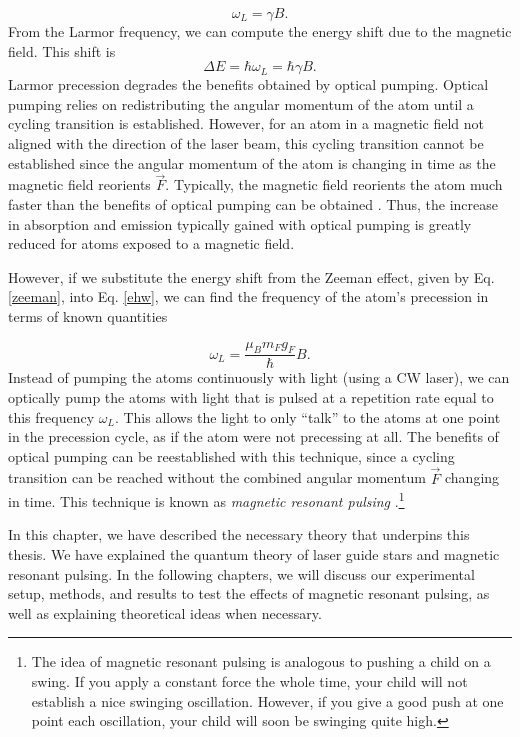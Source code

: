 \begin{equation}
  \omega_L = \gamma B.
  \label{larmorfrequency}
\end{equation}
%
From the Larmor frequency, we can compute the energy shift due to the magnetic field. This shift is
\begin{equation}
		\Delta E = \hbar \omega_L = \hbar \gamma B.
		\label{ehw}
\end{equation}
%
Larmor precession degrades the benefits obtained by optical pumping. Optical pumping relies on redistributing the angular momentum of the atom until a cycling transition is established. However, for an atom in a magnetic field not aligned with the direction of the laser beam, this cycling transition cannot be established since the angular momentum of the atom is changing in time as the magnetic field reorients $\vec F$. Typically, the magnetic field reorients the atom much faster than the benefits of optical pumping can be obtained \cite{Kane2014}. Thus, the increase in absorption and emission typically gained with optical pumping is greatly reduced for atoms exposed to a magnetic field.




However, if we substitute the energy shift from the Zeeman effect, given by Eq. \ref{zeeman}, into Eq. \ref{ehw}, we can find the frequency of the atom's precession in terms of known quantities

\begin{equation}
	\omega_L = \frac{\mu_B m_F g_F}{\hbar} B.
  \label{zeemanf}
\end{equation}
%
Instead of pumping the atoms continuously with light (using a CW laser), we can optically pump the atoms with light that is pulsed at a repetition rate equal to this frequency $\omega_L$. This allows the light to only ``talk'' to the atoms at one point in the precession cycle, as if the atom were not precessing at all. The benefits of optical pumping can be reestablished with this technique, since a cycling transition can be reached without the combined angular momentum $\vec F$ changing in time. This technique is known as \textit{magnetic resonant pulsing} \cite{Kane2014}.\footnote{The idea of magnetic resonant pulsing is analogous to pushing a child on a swing. If you apply a constant force the whole time, your child will not establish a nice swinging oscillation. However, if you give a good push at one point each oscillation, your child will soon be swinging quite high.}


In this chapter, we have described the necessary theory that underpins this thesis. We have explained the quantum theory of laser guide stars and magnetic resonant pulsing. In the following chapters, we will discuss our experimental setup, methods, and results to test the effects of magnetic resonant pulsing, as well as explaining theoretical ideas when necessary.
